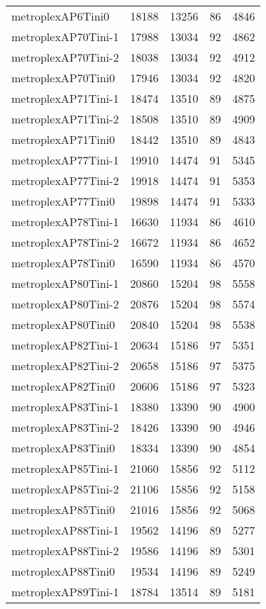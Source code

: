 \begin{longtable}{lrrrr}
metroplexAP6Tini0 & 18188 & 13256 & 86 & 4846 \\
metroplexAP70Tini-1 & 17988 & 13034 & 92 & 4862 \\
metroplexAP70Tini-2 & 18038 & 13034 & 92 & 4912 \\
metroplexAP70Tini0 & 17946 & 13034 & 92 & 4820 \\
metroplexAP71Tini-1 & 18474 & 13510 & 89 & 4875 \\
metroplexAP71Tini-2 & 18508 & 13510 & 89 & 4909 \\
metroplexAP71Tini0 & 18442 & 13510 & 89 & 4843 \\
metroplexAP77Tini-1 & 19910 & 14474 & 91 & 5345 \\
metroplexAP77Tini-2 & 19918 & 14474 & 91 & 5353 \\
metroplexAP77Tini0 & 19898 & 14474 & 91 & 5333 \\
metroplexAP78Tini-1 & 16630 & 11934 & 86 & 4610 \\
metroplexAP78Tini-2 & 16672 & 11934 & 86 & 4652 \\
metroplexAP78Tini0 & 16590 & 11934 & 86 & 4570 \\
metroplexAP80Tini-1 & 20860 & 15204 & 98 & 5558 \\
metroplexAP80Tini-2 & 20876 & 15204 & 98 & 5574 \\
metroplexAP80Tini0 & 20840 & 15204 & 98 & 5538 \\
metroplexAP82Tini-1 & 20634 & 15186 & 97 & 5351 \\
metroplexAP82Tini-2 & 20658 & 15186 & 97 & 5375 \\
metroplexAP82Tini0 & 20606 & 15186 & 97 & 5323 \\
metroplexAP83Tini-1 & 18380 & 13390 & 90 & 4900 \\
metroplexAP83Tini-2 & 18426 & 13390 & 90 & 4946 \\
metroplexAP83Tini0 & 18334 & 13390 & 90 & 4854 \\
metroplexAP85Tini-1 & 21060 & 15856 & 92 & 5112 \\
metroplexAP85Tini-2 & 21106 & 15856 & 92 & 5158 \\
metroplexAP85Tini0 & 21016 & 15856 & 92 & 5068 \\
metroplexAP88Tini-1 & 19562 & 14196 & 89 & 5277 \\
metroplexAP88Tini-2 & 19586 & 14196 & 89 & 5301 \\
metroplexAP88Tini0 & 19534 & 14196 & 89 & 5249 \\
metroplexAP89Tini-1 & 18784 & 13514 & 89 & 5181 \\

\end{longtable}
